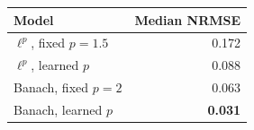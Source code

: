 \begin{tabular}{lr}
\toprule
Model & Median NRMSE \\
\midrule
$\ell^p$, fixed $p=1.5$ & 0.172 \\
$\ell^p$, learned $p$ & 0.088 \\
Banach, fixed $p=2$ & 0.063 \\
Banach, learned $p$ & \textbf{0.031} \\
\bottomrule
\end{tabular}

